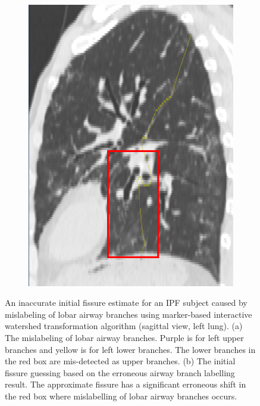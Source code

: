 {\begin{figure}[H]
\begin{subfigure}{.345\linewidth}
  \includegraphics[width=\linewidth,trim={{.0\wd0} {.0\wd0} {.0\wd0} {.0\wd0}},clip]{Segmentation/Image/YUAN_WateredFissureGuessing.png}
  \caption{}
  \label{fig:WateredAirwayMislabelled-b} 
\end{subfigure}
\caption{An inaccurate initial fissure estimate for an IPF subject caused by mislabeling of lobar airway branches using marker-based interactive watershed transformation algorithm (sagittal view, left lung). (a) The mislabeling of lobar airway branches. Purple is for left upper branches and yellow is for left lower branches. The lower branches in the red box are mis-detected as upper branches. (b) The initial fissure guessing based on the erroneous airway branch labelling result. The approximate fissure has a significant erroneous shift in the red box where mislabelling of lobar airway branches occurs.}
\label{fig:WateredAirwayMislabelled}
\end{figure}

}
